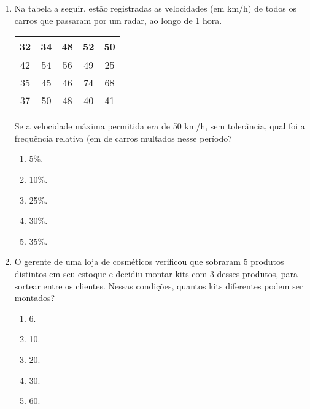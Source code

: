 \documentclass[a4paper,14pt]{article}
\begin{document}
\begin{enumerate}
        \item Na tabela a seguir, estão registradas as velocidades (em km/h) de todos os carros que passaram por um
        radar, ao longo de 1 hora.
        
        \begin{tabular}{|c|c|c|c|c|} %
        	\hline %
        	32 & 34 & 48 & 52 & 50 \\ %
        	\hline %
        	42 & 54 & 56 & 49 & 25 \\ %
        	\hline %
        	35 & 45 & 46 & 74 & 68 \\ %
        	\hline %
        	37 & 50 & 48 & 40 & 41 \\ %
        	\hline %
        \end{tabular}
        \newline
        \newline
        Se a velocidade máxima permitida era de 50 km/h, sem tolerância, qual foi a frequência relativa (em %
        de carros multados nesse período?
        \newline
        \begin{enumerate}
        	\item 5\%.
        	\item 10\%.
        	\item 25\%.
        	\item 30\%.
        	\item 35\%.
        \end{enumerate}
        \vspace{4cm}
        
        \item O gerente de uma loja de cosméticos verificou que sobraram 5 produtos distintos em seu estoque e
        decidiu montar kits com 3 desses produtos, para sortear entre os clientes.
        Nessas condições, quantos kits diferentes podem ser montados?
        \begin{enumerate}
        	\item 6.
        	\item 10.
        	\item 20.
        	\item 30.
        	\item 60.
        \end{enumerate}
        \vspace{4cm}
        

\end{enumerate}
\end{document}
